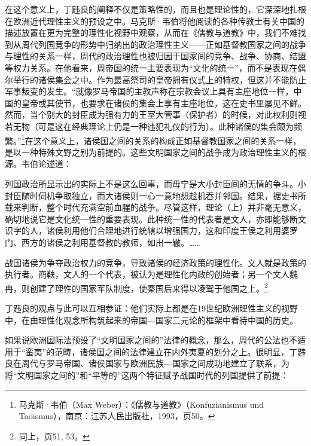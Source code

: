 \documentclass[a4paper, 12pt, openright]{ctexbook}
\renewenvironment{quote}
  {\list{}{\rightmargin2\ccwd \leftmargin2\ccwd \itemindent=2\ccwd \listparindent=2\ccwd}%
   \item\relax\small\kaishu\color{black}}
  {\endlist}
\begin{document}
在这个意义上，丁韪良的阐释不仅是策略性的，而且也是理论性的，它深深地扎根在欧洲近代理性主义的预设之中。马克斯·韦伯将他阅读的各种传教士有关中国的描述放置在更为完整的理性化视野中观察，从而在《儒教与道教》中，我们不难找到从周代列国竞争的形势中归纳出的政治理性主义——正如基督教国家之间的战争与理性的关系一样，周代的政治理性也被归因于国家间的竞争、战争、协商、结盟等权力关系。在他看来，周帝国的统一主要表现为“文化的统一”，而不是表现在偶尔举行的诸侯集会之中。作为最高祭司的皇帝拥有仪式上的特权，但这并不能防止军事叛变的发生。“就像罗马帝国的主教声称在宗教会议上具有主座地位一样，中国的皇帝或其使节，也要求在诸侯的集会上享有主座地位，这在史书里屡见不鲜。然而，当个别大的封臣成为强有力的王室大管事（保护者）的时候，对此权利则视若无物（可是这在经典理论上仍是一种违犯礼仪的行为）。此种诸侯的集会颇为频繁。”\footnote{马克斯·韦伯（Max Weber）：《儒教与道教》（Konfuzianismus und Taoismus），南京：江苏人民出版社，1993，页50。}在这个意义上，诸侯国之间的关系的构成正如基督教国家之间的关系一样，是以一种特殊文野之别为前提的。这些文明国家之间的战争成为政治理性主义的根源。韦伯论述道：

\begin{quote}
列国政治所显示出的实际上不是这么回事，而毋宁是大小封臣间的无情的争斗。小封臣随时伺机争取独立，而大诸侯则一心一意地想趁机吞并邻国。结果，据史书所载来判断，整个时代充满空前血腥的战争。尽管这样，理论（上）并非毫无意义，确切地说它是文化统一性的重要表现。此种统一性的代表者是文人，亦即能够断文识字的人，诸侯利用他们合理地进行统辖以增强国力，这和印度王侯之利用婆罗门、西方的诸侯之利用基督教的教师，如出一辙。……

战国诸侯为争夺政治权力的竞争，导致诸侯的经济政策的理性化。文人就是政策的执行者。商鞅，文人的一个代表，被认为是理性化内政的创始者；另一个文人魏冉，则创建了理性的国家军队制度，使秦国后来得以凌驾于他国之上。\footnote{同上，页51, 53。}
\end{quote}

丁韪良的观点与此可以互相参证：他们实际上都是在19世纪欧洲理性主义的视野中，在由理性化观念所构筑起来的帝国—国家二元论的框架中看待中国的历史。

如果说欧洲国际法预设了“文明国家之间的”法律的概念，那么，周代的公法也不适用于“蛮夷”的范畴，诸侯国之间的法律建立在内外夷夏的划分之上。很明显，丁韪良在周代与罗马帝国、诸侯国家与欧洲民族—国家之间成功地建立了联系，为将“文明国家之间的”和“平等的”这两个特征赋予战国时代的列国提供了前提：
\end{document}
